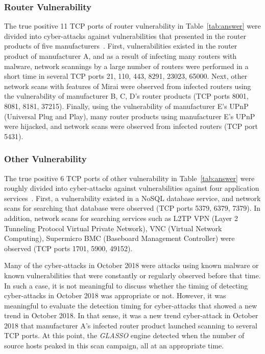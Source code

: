 \documentclass[conference]{IEEEtran}
\begin{document}
\subsubsection{Router Vulnerability}
The true positive 11 TCP ports of router vulnerability in Table~\ref{tab:answer} were divided into cyber-attacks against vulnerabilities that presented in the router products of five manufacturers~\cite{Huawei,Netlab_BCM,Netlab_MikroTik}.
First, vulnerabilities existed in the router product of manufacturer A, and as a result of infecting many routers with malware, network scannings by a large number of routers were performed in a short time in several TCP ports 21, 110, 443, 8291, 23023, 65000.
Next, other network scans with features of Mirai were observed from infected routers using the vulnerability of manufacturer B, C, D's router products (TCP ports 8001, 8081, 8181, 37215).
Finally, using the vulnerability of manufacturer E's UPnP (Universal Plug and Play), many router products using manufacturer E's UPnP were hijacked, and network scans were observed from infected routers (TCP port 5431).



\subsubsection{Other Vulnerability}
The true positive 6 TCP ports of other vulnerability in Table~\ref{tab:answer} were roughly divided into cyber-attacks against vulnerabilities against four application services~\cite{Imperva}.
First, a vulnerability existed in a NoSQL database service, and network scans for searching that database were observed (TCP ports 5379, 6379, 7379).
In addition, network scans for searching services such as L2TP VPN (Layer 2 Tunneling Protocol Virtual Private Network), VNC (Virtual Network Computing), Supermicro BMC (Baseboard Management Controller) were observed (TCP ports 1701, 5900, 49152).


Many of the cyber-attacks in October 2018 were attacks using known malware or known vulnerabilities that were constantly or regularly observed before that time.
In such a case, it is not meaningful to discuss whether the timing of detecting cyber-attacks in October 2018 was appropriate or not.
However, it was meaningful to evaluate the detection timing for cyber-attacks that showed a new trend in October 2018.
In that sense, it was a new trend cyber-attack in October 2018 that manufacturer A's infected router product launched scanning to several TCP ports.
At this point, the {\it GLASSO} engine detected when the number of source hosts peaked in this scan campaign, all at an appropriate time.
\end{document}
